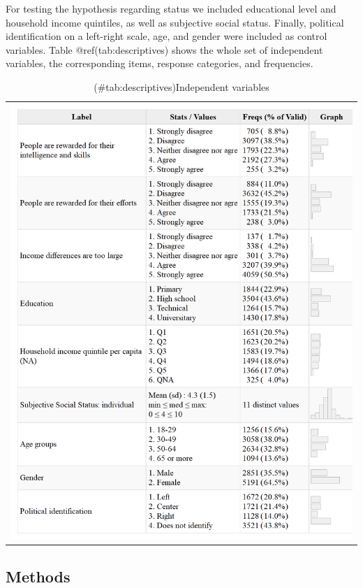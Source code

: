 \documentclass[
  12pt,
  a4paper,
]{article}
\begin{document}
For testing the hypothesis regarding status we included educational
level and household income quintiles, as well as subjective social
status. Finally, political identification on a left-right scale, age,
and gender were included as control variables. Table
@ref(tab:descriptives) shows the whole set of independent variables, the
corresponding items, response categories, and frequencies.

\begin{longtable}[]{@{}l@{}}
\caption{(\#tab:descriptives)Independent variables}\tabularnewline
\toprule\noalign{}
\endfirsthead
\endhead
\bottomrule\noalign{}
\endlastfoot
\includegraphics{output/tables/desc02.png} \\
\end{longtable}

\hypertarget{methods}{%
\subsection{Methods}\label{methods}}
\end{document}
